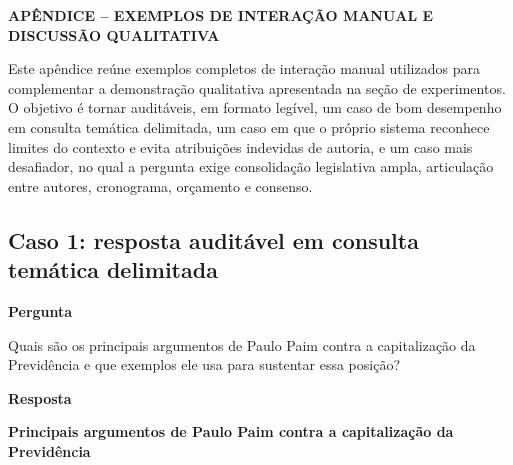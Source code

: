 \clearpage
{}
{}
\begin{center}
\textbf{APÊNDICE  -- EXEMPLOS DE INTERAÇÃO MANUAL E DISCUSSÃO QUALITATIVA}
\end{center}
\label{sec:apendice-interacao}

Este apêndice reúne exemplos completos de interação manual utilizados para complementar a demonstração qualitativa apresentada na seção de experimentos. O objetivo é tornar auditáveis, em formato legível, um caso de bom desempenho em consulta temática delimitada, um caso em que o próprio sistema reconhece limites do contexto e evita atribuições indevidas de autoria, e um caso mais desafiador, no qual a pergunta exige consolidação legislativa ampla, articulação entre autores, cronograma, orçamento e consenso.

\subsection{Caso 1: resposta auditável em consulta temática delimitada}\label{sec:anexo-caso-bom}

\textbf{Pergunta}

Quais são os principais argumentos de Paulo Paim contra a capitalização da Previdência e que exemplos ele usa para sustentar essa posição?

\textbf{Resposta}

\textbf{Principais argumentos de Paulo Paim contra a capitalização da Previdência}

